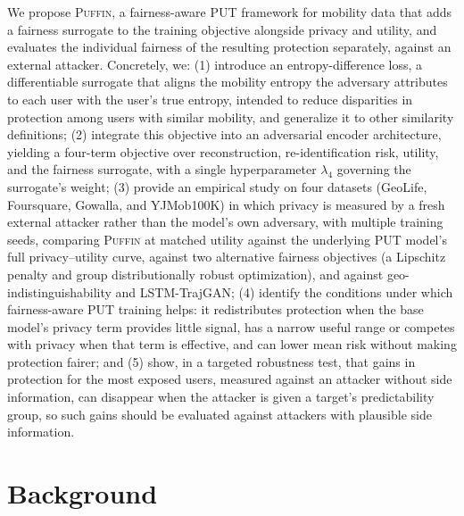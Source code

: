 \documentclass[sigconf,anonymous,review]{acmart}
\newcommand{\puffin}{\textsc{Puffin}}
\begin{document}
We propose \puffin, a fairness-aware PUT framework for mobility data that adds a fairness surrogate to the training objective alongside privacy and utility, and evaluates the individual fairness of the resulting protection separately, against an external attacker. Concretely, we:
(1) introduce an entropy-difference loss, a differentiable surrogate that aligns the mobility entropy the adversary attributes to each user with the user's true entropy, intended to reduce disparities in protection among users with similar mobility, and generalize it to other similarity definitions;
(2) integrate this objective into an adversarial encoder architecture, yielding a four-term objective over reconstruction, re-identification risk, utility, and the fairness surrogate, with a single hyperparameter $\lambda_4$ governing the surrogate's weight;
(3) provide an empirical study on four datasets (GeoLife, Foursquare, Gowalla, and YJMob100K) in which privacy is measured by a fresh external attacker rather than the model's own adversary, with multiple training seeds, comparing \puffin{} at matched utility against the underlying PUT model's full privacy--utility curve, against two alternative fairness objectives (a Lipschitz penalty and group distributionally robust optimization), and against geo-indistinguishability and LSTM-TrajGAN;
(4) identify the conditions under which fairness-aware PUT training helps: it redistributes protection when the base model's privacy term provides little signal, has a narrow useful range or competes with privacy when that term is effective, and can lower mean risk without making protection fairer; and
(5) show, in a targeted robustness test, that gains in protection for the most exposed users, measured against an attacker without side information, can disappear when the attacker is given a target's predictability group, so such gains should be evaluated against attackers with plausible side information.

\section{Background}
\end{document}
